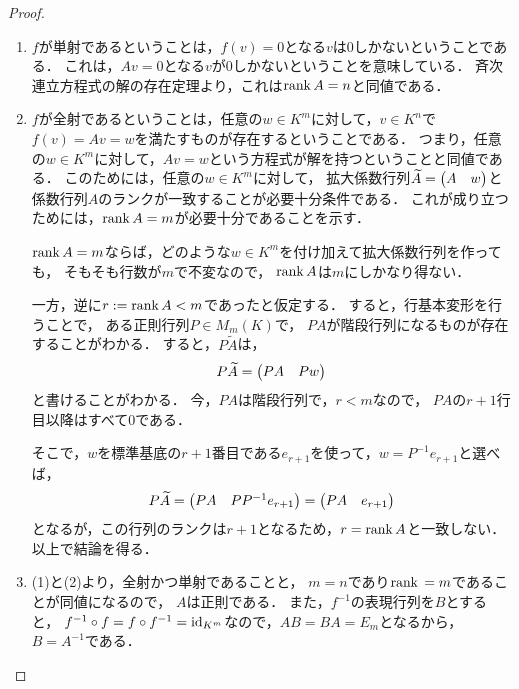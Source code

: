 \begin{proof}
    \begin{enumerate}
        \item $f$が単射であるということは，$f(v)=0$となる$v$は$0$しかないということである．
        これは，$Av = 0$となる$v$が$0$しかないということを意味している．
        斉次連立方程式の解の存在定理より，これは$\mathrm{rank}\, A = n$と同値である．
        \item $f$が全射であるということは，任意の$w \in K^m$に対して，$v \in K^n$で$f(v)=Av=w$を満たすものが存在するということである．
        つまり，任意の$w \in K^m$に対して，$Av=w$という方程式が解を持つということと同値である．
        このためには，任意の$w \in K^m$に対して，
        拡大係数行列$\widetilde{A} = \begin{pmatrix} A & w \end{pmatrix}$と係数行列$A$のランクが一致することが必要十分条件である．
        これが成り立つためには，$\mathrm{rank}\, A = m$が必要十分であることを示す．
        
        $\mathrm{rank}\, A = m$ならば，どのような$w \in K^m$を付け加えて拡大係数行列を作っても，
        そもそも行数が$m$で不変なので，
        $\mathrm{rank}\, A$は$m$にしかなり得ない．
        
        一方，逆に$r :=\mathrm{rank}\, A < m$であったと仮定する．
        すると，行基本変形を行うことで，
        ある正則行列$P \in M_{m}(K)$で，
        $PA$が階段行列になるものが存在することがわかる．
        すると，$P\widetilde{A}$は，
        \[
            P\widetilde{A} = \begin{pmatrix} PA & Pw \end{pmatrix}
        \]
        と書けることがわかる．
        今，$PA$は階段行列で，$r < m$なので，
        $PA$の$r+1$行目以降はすべて0である．
        
        そこで，$w$を標準基底の$r+1$番目である$e_{r+1}$を使って，$w = P^{-1}e_{r+1}$と選べば，
        \[
            P\widetilde{A} = \begin{pmatrix} PA & PP^{-1}e_{r+1} \end{pmatrix} = \begin{pmatrix} PA & e_{r+1} \end{pmatrix}
        \]
        となるが，この行列のランクは$r+1$となるため，$r = \mathrm{rank}\, A$と一致しない．
        以上で結論を得る．
        \item (1)と(2)より，全射かつ単射であることと，
        $m = n$であり$\mathrm{rank}\, = m$であることが同値になるので，
        $A$は正則である．
        また，$f^{-1}$の表現行列を$B$とすると，
        $f^{-1}\circ f = f \circ f^{-1} = \mathrm{id}_{K^m}$なので，$AB=BA=E_m$となるから，
        $B=A^{-1}$である．
    \end{enumerate}
\end{proof}
